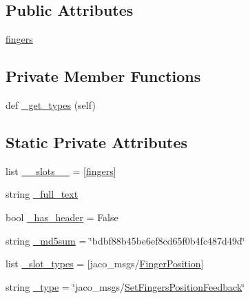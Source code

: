 \subsection*{Public Attributes}
\begin{DoxyCompactItemize}
\item 
\hyperlink{classjaco__msgs_1_1msg_1_1__SetFingersPositionFeedback_1_1SetFingersPositionFeedback_aa84e44e4961d47b71b528f18cfb0805b}{fingers}
\end{DoxyCompactItemize}
\subsection*{Private Member Functions}
\begin{DoxyCompactItemize}
\item 
def \hyperlink{classjaco__msgs_1_1msg_1_1__SetFingersPositionFeedback_1_1SetFingersPositionFeedback_acaff37d6b64a90f8f8432e965c3ab4cc}{\+\_\+get\+\_\+types} (self)
\end{DoxyCompactItemize}
\subsection*{Static Private Attributes}
\begin{DoxyCompactItemize}
\item 
list \hyperlink{classjaco__msgs_1_1msg_1_1__SetFingersPositionFeedback_1_1SetFingersPositionFeedback_a8afdb24c780db4674a2faad700d7c0ba}{\+\_\+\+\_\+slots\+\_\+\+\_\+} = \mbox{[}\textquotesingle{}\hyperlink{classjaco__msgs_1_1msg_1_1__SetFingersPositionFeedback_1_1SetFingersPositionFeedback_aa84e44e4961d47b71b528f18cfb0805b}{fingers}\textquotesingle{}\mbox{]}
\item 
string \hyperlink{classjaco__msgs_1_1msg_1_1__SetFingersPositionFeedback_1_1SetFingersPositionFeedback_a1ba86f8e6d822ebd44f54a4fc7f01418}{\+\_\+full\+\_\+text}
\item 
bool \hyperlink{classjaco__msgs_1_1msg_1_1__SetFingersPositionFeedback_1_1SetFingersPositionFeedback_a1d74b76cfeafbada370c271881784655}{\+\_\+has\+\_\+header} = False
\item 
string \hyperlink{classjaco__msgs_1_1msg_1_1__SetFingersPositionFeedback_1_1SetFingersPositionFeedback_a3f4a0d1fd0725e31a55d5aa2e34a68be}{\+\_\+md5sum} = \char`\"{}bdbf88b45be6ef8cd65f0b4fc487d49d\char`\"{}
\item 
list \hyperlink{classjaco__msgs_1_1msg_1_1__SetFingersPositionFeedback_1_1SetFingersPositionFeedback_ab8b20ff9ddd0398ec2a011fea6ff1ae8}{\+\_\+slot\+\_\+types} = \mbox{[}\textquotesingle{}jaco\+\_\+msgs/\hyperlink{classjaco__msgs_1_1msg_1_1__FingerPosition_1_1FingerPosition}{Finger\+Position}\textquotesingle{}\mbox{]}
\item 
string \hyperlink{classjaco__msgs_1_1msg_1_1__SetFingersPositionFeedback_1_1SetFingersPositionFeedback_a1ada59eb9dfc3cc4e7abc71f77275f14}{\+\_\+type} = \char`\"{}jaco\+\_\+msgs/\hyperlink{classjaco__msgs_1_1msg_1_1__SetFingersPositionFeedback_1_1SetFingersPositionFeedback}{Set\+Fingers\+Position\+Feedback}\char`\"{}
\end{DoxyCompactItemize}


